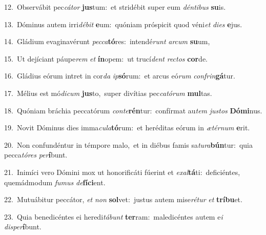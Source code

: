 {\numbfont\textcolor{\numbcolor}{12.}}~Observábit pec\-\textit{cá}\-\textit{tor} \textbf{jus}\-tum:~\star et stridébit super eum \textit{dén}\-\textit{ti}\textit{bus} \textbf{su}\-is.\par
{\numbfont\textcolor{\numbcolor}{13.}}~Dóminus autem irri\-\textit{dé}\-\textit{bit} \textbf{e}\-um:~\star quóniam próspicit quod véni\textit{et} \textit{di}\-\textit{es} \textbf{e}\-jus.\par
{\numbfont\textcolor{\numbcolor}{14.}}~Gládium evaginavérunt \textit{pec}\-\textit{ca}\textbf{tó}res:~\star intendé\textit{runt} \textit{ar}\-\textit{cum} \textbf{su}\-um,\par
{\numbfont\textcolor{\numbcolor}{15.}}~Ut dejíciant páupe\textit{rem} \textit{et} \textbf{ín}\-opem:~\star ut trucí\textit{dent} \textit{rec}\-\textit{tos} \textbf{cor}\-de.\par
{\numbfont\textcolor{\numbcolor}{16.}}~Gládius eórum intret in cor\textit{da} \textit{ip}\-\textbf{só}rum:~\star et arcus eó\textit{rum} \textit{con}\-\textit{frin}\textbf{gá}tur.\par
{\numbfont\textcolor{\numbcolor}{17.}}~Mélius est mó\-\textit{di}\-\textit{cum} \textbf{jus}\-to,~\star super divítias pec\-\textit{ca}\-\textit{tó}\textit{rum} \textbf{mul}\-tas.\par
{\numbfont\textcolor{\numbcolor}{18.}}~Quóniam bráchia peccatórum \textit{con}\-\textit{te}\textbf{rén}tur:~\star confírmat au\textit{tem} \textit{jus}\-\textit{tos} \textbf{Dó}\-\textbf{mi}nus.\par
{\numbfont\textcolor{\numbcolor}{19.}}~Novit Dóminus dies imma\-\textit{cu}\-\textit{la}\textbf{tó}rum:~\star et heréditas eórum in \textit{æ}\-\textit{tér}\textit{num} \textbf{e}\-rit.\par
{\numbfont\textcolor{\numbcolor}{20.}}~Non confundéntur in témpore malo,~\dagger et in diébus famis sa\-\textit{tu}\-\textit{ra}\textbf{bún}tur:~\star quia pecca\-\textit{tó}\-\textit{res} \textit{per}\-\textbf{í}bunt.\par
{\numbfont\textcolor{\numbcolor}{21.}}~Inimíci vero Dómini mox ut honorificáti fúerint et \textit{ex}\-\textit{al}\textbf{tá}ti:~\star deficiéntes, quemádmodum \textit{fu}\-\textit{mus} \textit{de}\-\textbf{fí}\textbf{ci}ent.\par
{\numbfont\textcolor{\numbcolor}{22.}}~Mutuábitur peccátor, \textit{et} \textit{non} \textbf{sol}\-vet:~\star justus autem mise\-\textit{ré}\-\textit{tur} \textit{et} \textbf{trí}\-\textbf{bu}et.\par
{\numbfont\textcolor{\numbcolor}{23.}}~Quia benedicéntes ei heredi\-\textit{tá}\-\textit{bunt} \textbf{ter}\-ram:~\star maledicéntes autem e\textit{i} \textit{dis}\-\textit{per}\textbf{í}bunt.\par
